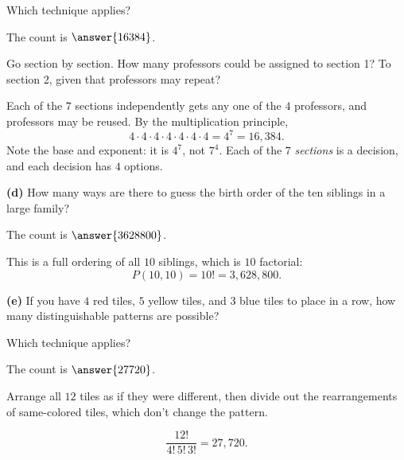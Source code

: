 \documentclass[12pt]{ximera}
\begin{document}
\begin{problem}
\begin{prompt}
Which technique applies?
\begin{multipleChoice}
\end{multipleChoice}

The count is $\answer{16384}$.

\begin{hint}
Go section by section. How many professors could be assigned to section 1? To
section 2, given that professors may repeat?
\end{hint}

\begin{feedback}
Each of the $7$ sections independently gets any one of the $4$ professors, and
professors may be reused. By the multiplication principle,
\[
4\cdot 4\cdot 4\cdot 4\cdot 4\cdot 4\cdot 4 = 4^7 = 16{,}384.
\]
Note the base and exponent: it is $4^7$, not $7^4$. Each of the $7$ \emph{sections}
is a decision, and each decision has $4$ options.
\end{feedback}
\end{prompt}

\begin{prompt}
\textbf{(d)} How many ways are there to guess the birth order of the ten siblings in
a large family?

The count is $\answer{3628800}$.

\begin{feedback}
This is a full ordering of all $10$ siblings, which is $10$ factorial:
\[
P(10,10)=10! = 3{,}628{,}800.
\]
\end{feedback}
\end{prompt}

\begin{prompt}
\textbf{(e)} If you have $4$ red tiles, $5$ yellow tiles, and $3$ blue tiles to place in
a row, how many distinguishable patterns are possible?

Which technique applies?
\begin{multipleChoice}
\end{multipleChoice}

The count is $\answer{27720}$.

\begin{hint}
Arrange all $12$ tiles as if they were different, then divide out the rearrangements of
same-colored tiles, which don't change the pattern.
\end{hint}

\begin{feedback}
\[ \frac{12!}{4!\,5!\,3!}=27{,}720. \]
\end{feedback}
\end{prompt}
\end{problem}
\end{document}

